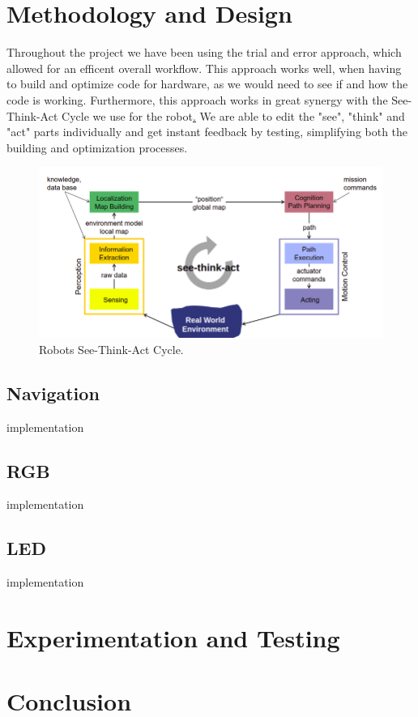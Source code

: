 \documentclass[conference]{IEEEtran}
\begin{document}
\section{Methodology and Design}
Throughout the project we have been using the trial and error approach, which allowed for an efficent overall workflow.
This approach works well, when having to build and optimize code for hardware, as we would need to see if and how the code is working.
Furthermore, this approach works in great synergy with the See-Think-Act Cycle we use for the robot\hyperref[sec:STAC].
We are able to edit the "see", "think" and "act" parts individually and get instant feedback by testing, simplifying both the building and optimization processes.
\begin{figure}[htbp]
    \centerline{\includegraphics[width=1.0\columnwidth]{STAC.png}}
    \caption{Robots See-Think-Act Cycle.}
    \label{sec:STAC}
    \end{figure}

\subsection{Navigation}

implementation
\subsection{RGB}
implementation
\subsection{LED}
implementation
\section{Experimentation and Testing}

\section{Conclusion}
\end{document}
